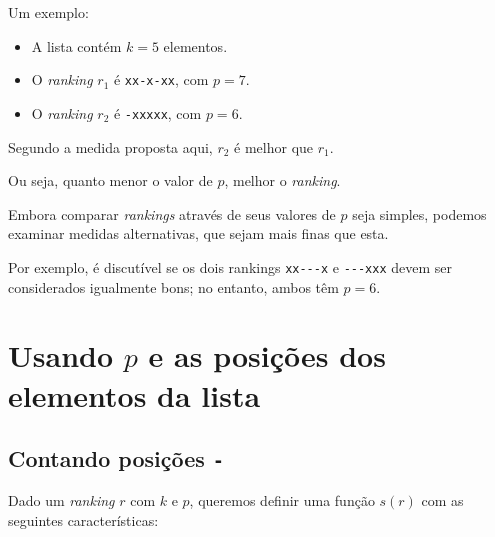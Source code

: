 \documentclass[
  letterpaper,
  DIV=11,
  numbers=noendperiod]{scrreprt}
\begin{document}
Um exemplo:

\begin{itemize}
\item
  A lista contém $k = 5$ elementos.
\item
  O \emph{ranking} $r_1$ é \texttt{xx-x-xx}, com $p = 7$.
\item
  O \emph{ranking} $r_2$ é \texttt{-xxxxx}, com $p = 6$.
\end{itemize}

Segundo a medida proposta aqui, $r_2$ é melhor que $r_1$.

Ou seja, quanto menor o valor de $p$, melhor o \emph{ranking}.

Embora comparar \emph{rankings} através de seus valores de $p$ seja
simples, podemos examinar medidas alternativas, que sejam mais finas que
esta.

Por exemplo, é discutível se os dois rankings \texttt{xx-\/-\/-x} e
\texttt{-\/-\/-xxx} devem ser considerados igualmente bons; no entanto,
ambos têm $p = 6$.

\section{\texorpdfstring{Usando $p$ e as posições dos elementos da
lista}{Usando  e as posições dos elementos da lista}}\label{usando-p-e-as-posiuxe7uxf5es-dos-elementos-da-lista}

\subsection{\texorpdfstring{Contando posições
\texttt{-}}{Contando posições -}}\label{contando-posiuxe7uxf5es--}

Dado um \emph{ranking} $r$ com $k$ e $p$, queremos definir uma função
$s(r)$ com as seguintes características:
\end{document}
